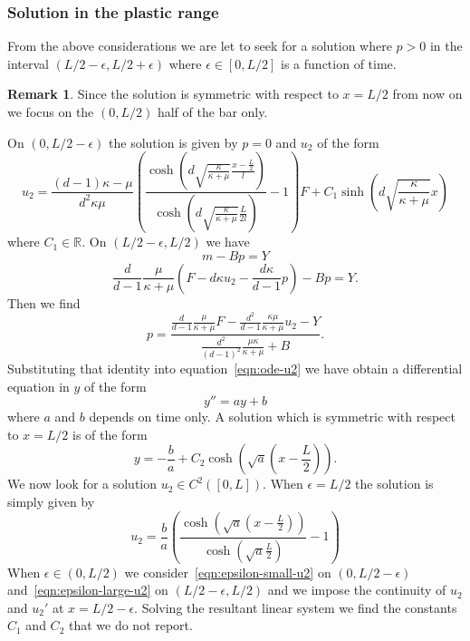 \documentclass[a4paper,10pt,twoside]{amsbook}
\numberwithin{section}{chapter}
\numberwithin{equation}{chapter}
\theoremstyle{definition}
\newtheorem{rmk}[prop]{Remark}
\begin{document}
\subsubsection*{Solution in the plastic range}

From the above considerations we are let to seek for a solution where $p>0$ in the interval $(L/2-\epsilon,L/2+\epsilon)$ where $\epsilon\in[0,L/2]$ is a function of time.
\begin{rmk}
Since the solution is symmetric with respect to $x=L/2$ from now on we focus on the $(0,L/2)$ half of the bar only.
\end{rmk}
On $(0,L/2-\epsilon)$ the solution is given by $p=0$ and $u_2$ of the form
\begin{equation}
\label{eqn:epsilon-small-u2}
u_2=\frac{(d-1)\kappa-\mu}{d^2\kappa\mu}\left(\frac{\cosh\left(d\sqrt{\frac{\kappa}{\kappa+\mu}}\frac{x-\frac{L}{2}}{l}\right)}{\cosh\left(d\sqrt{\frac{\kappa}{\kappa+\mu}}\frac{L}{2l}\right)}-1\right)F+C_1\sinh\left(d\sqrt{\frac{\kappa}{\kappa+\mu}}x\right)
\end{equation}
where $C_1\in\mathbb{R}$. On $(L/2-\epsilon,L/2)$ we have
\[
m-Bp=Y
\]
\[
\frac{d}{d-1}\frac{\mu}{\kappa+\mu}(F-d\kappa u_2-\frac{d\kappa}{d-1}p)-Bp=Y.
\]
Then we find
\begin{equation*}
\label{eqn:p-as-function-of-y}
p=\frac{\frac{d}{d-1}\frac{\mu}{\kappa+\mu}F-\frac{d^2}{d-1}\frac{\kappa\mu}{\kappa+\mu}u_2-Y}{\frac{d^2}{(d-1)^2}\frac{\mu\kappa}{\kappa+\mu}+B}.
\end{equation*}
Substituting that identity into equation~\eqref{eqn:ode-u2} we have obtain a differential equation in $y$ of the form
\[
y''=ay+b
\]
where $a$ and $b$ depends on time only. A solution which is symmetric with respect to $x=L/2$ is of the form
\begin{equation}
\label{eqn:epsilon-large-u2}
y=-\frac{b}{a}+C_2\cosh\left(\sqrt{a}\left(x-\frac{L}{2}\right)\right).
\end{equation}
We now look for a solution $u_2\in C^2([0,L])$. When $\epsilon=L/2$ the solution is simply given by
\[
u_2=\frac{b}{a}\left(\frac{\cosh\left(\sqrt{a}\left(x-\frac{L}{2}\right)\right)}{\cosh\left(\sqrt{a}\frac{L}{2}\right)}-1\right)
\]
When $\epsilon\in(0,L/2)$ we consider~\eqref{eqn:epsilon-small-u2} on $(0,L/2-\epsilon)$ and~\eqref{eqn:epsilon-large-u2} on $(L/2-\epsilon,L/2)$ and we impose the continuity of $u_2$ and $u_2'$ at $x=L/2-\epsilon$. Solving the resultant linear system we find the constants $C_1$ and $C_2$ that we do not report.
\end{document}
